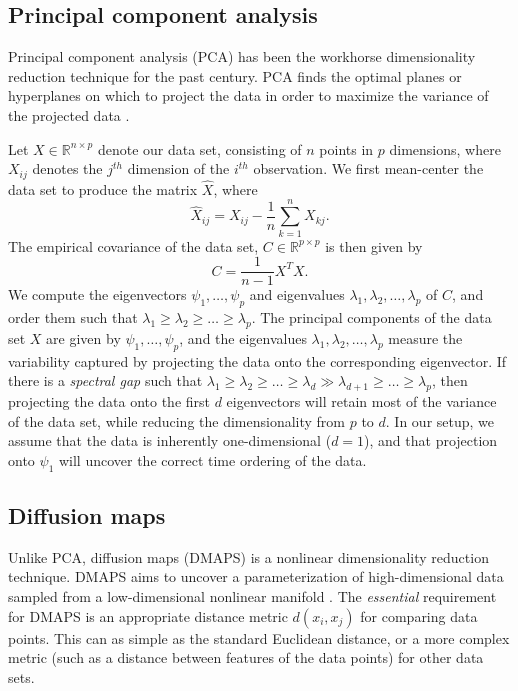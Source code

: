 \documentclass[10pt]{article}
\begin{document}
\subsection*{Principal component analysis}
Principal component analysis (PCA) has been the workhorse dimensionality reduction technique for the past century.
%
PCA finds the optimal planes or hyperplanes on which to project the data in order to maximize the variance of the projected data \cite{shlens2005tutorial}.

Let $X \in \mathbb{R}^{n \times p}$ denote our data set, consisting of $n$ points in $p$ dimensions, where $X_{ij}$ denotes the $j^{th}$ dimension of the $i^{th}$ observation. 
%
We first mean-center the data set to produce the matrix $\hat{X}$, where
\begin{equation}
\hat{X}_{ij} = X_{ij} - \frac{1}{n} \sum_{k=1}^n X_{kj}.
\end{equation}
%
The empirical covariance of the data set, $C \in \mathbb{R}^{p \times p}$ is then given by
\begin{equation}
C = \frac{1}{n-1} X^T X.
\end{equation}
%
We compute the eigenvectors $\psi_1, \dots, \psi_p$ and eigenvalues $\lambda_1, \lambda_2, \dots, \lambda_p$ of $C$, and order them such that $\lambda_1 \ge \lambda_2 \ge \dots \ge \lambda_p$.
%
The principal components of the data set $X$ are given by $\psi_1, \dots, \psi_p$, and the eigenvalues $\lambda_1, \lambda_2, \dots, \lambda_p$ measure the variability captured by projecting the data onto the corresponding eigenvector. 
%
If there is a {\em spectral gap} such that $\lambda_1 \ge \lambda_2 \ge \dots \ge \lambda_d \gg \lambda_{d+1} \ge \dots \ge \lambda_p$, then projecting the data onto the first $d$ eigenvectors will retain most of the variance of the data set, while reducing the dimensionality from $p$ to $d$.
%
In our setup, we assume that the data is inherently one-dimensional ($d=1$), and that projection onto $\psi_1$ will uncover the correct time ordering of the data.

\subsection*{Diffusion maps}
Unlike PCA, diffusion maps (DMAPS) is a nonlinear dimensionality reduction technique. 
%
DMAPS aims to uncover a parameterization of high-dimensional data sampled from a low-dimensional nonlinear manifold \cite{coifman2005geometric}.
%
The {\em essential} requirement for DMAPS is an appropriate distance metric $d(x_i, x_j)$ for comparing data points. 
%
This can as simple as the standard Euclidean distance, or a more complex metric (such as a distance between features of the data points) for other data sets.
\end{document}
